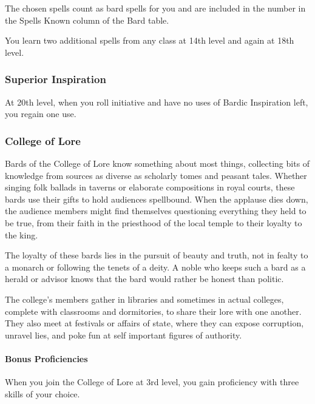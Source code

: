 \documentclass[
]{article}
\begin{document}
The chosen spells count as bard spells for you and are included in the
number in the Spells Known column of the Bard table.

You learn two additional spells from any class at 14th level and again
at 18th level.

\hypertarget{superior-inspiration}{%
\subsubsection{Superior Inspiration}\label{superior-inspiration}}

At 20th level, when you roll initiative and have no uses of Bardic
Inspiration left, you regain one use.

\hypertarget{college-of-lore}{%
\subsubsection{College of Lore}\label{college-of-lore}}

Bards of the College of Lore know something about most things,
collecting bits of knowledge from sources as diverse as scholarly tomes
and peasant tales. Whether singing folk ballads in taverns or elaborate
compositions in royal courts, these bards use their gifts to hold
audiences spellbound. When the applause dies down, the audience members
might find themselves questioning everything they held to be true, from
their faith in the priesthood of the local temple to their loyalty to
the king.

The loyalty of these bards lies in the pursuit of beauty and truth, not
in fealty to a monarch or following the tenets of a deity. A noble who
keeps such a bard as a herald or advisor knows that the bard would
rather be honest than politic.

The college's members gather in libraries and sometimes in actual
colleges, complete with classrooms and dormitories, to share their lore
with one another. They also meet at festivals or affairs of state, where
they can expose corruption, unravel lies, and poke fun at self important
figures of authority.

\hypertarget{bonus-proficiencies}{%
\paragraph{Bonus Proficiencies}\label{bonus-proficiencies}}

When you join the College of Lore at 3rd level, you gain proficiency
with three skills of your choice.
\end{document}
